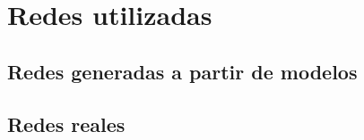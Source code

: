 \section{Redes utilizadas}

\subsection{Redes generadas a partir de modelos}


\subsection{Redes reales}